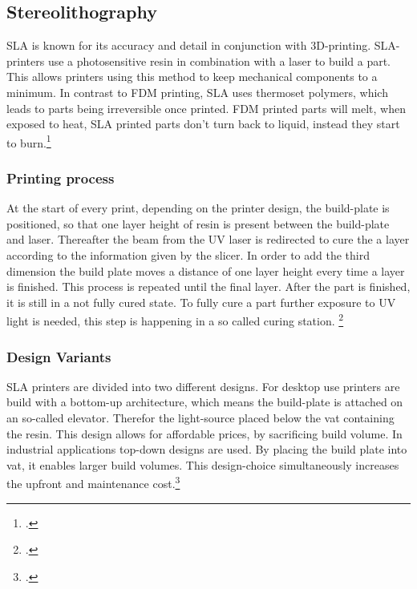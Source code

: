 \subsection{Stereolithography}

SLA is known for its accuracy and detail in conjunction with 3D-printing. SLA-printers use a photosensitive resin in combination with a laser to build a part. This allows printers using this method to keep mechanical components to a minimum. In contrast to FDM printing, SLA uses thermoset polymers, which leads to parts being irreversible once printed. FDM printed parts will melt, when exposed to heat, SLA printed parts don't turn back to liquid, instead they start to burn.\footcite{hubsSLA3DPrintingNoDate}

\subsubsection{Printing process}

At the start of every print, depending on the printer design, the build-plate is positioned, so that one layer height of resin is present between the build-plate and laser. Thereafter the beam from the UV laser is redirected to cure the a layer according to the information given by the slicer. In order to add the third dimension the build plate moves a distance of one layer height every time a layer is finished. This process is repeated until the final layer.\newline
After the part is finished, it is still in a not fully cured state. To fully cure a part further exposure to UV light is needed, this step is happening in a so called curing station. \footcite{hubsSLA3DPrintingNoDate} 

\subsubsection{Design Variants}

SLA printers are divided into two different designs. For desktop use printers are build with a bottom-up architecture, which means the build-plate is attached on an so-called elevator. Therefor the light-source placed below the vat containing the resin. This design allows for affordable prices, by sacrificing build volume.\newline
In industrial applications top-down designs are used. By placing the build plate into vat, it enables larger build volumes. This design-choice simultaneously increases the upfront and maintenance cost.\footcite{hubsIntroToFDM3DPrintingNoDate}